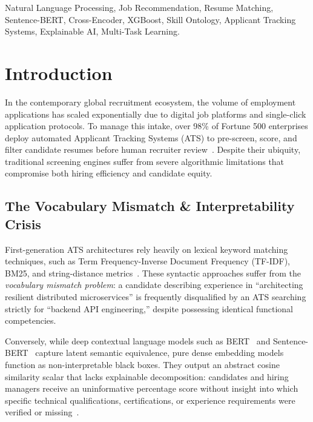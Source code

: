 \documentclass[conference]{IEEEtran}
\begin{document}
\begin{IEEEkeywords}
Natural Language Processing, Job Recommendation, Resume Matching, Sentence-BERT, Cross-Encoder, XGBoost, Skill Ontology, Applicant Tracking Systems, Explainable AI, Multi-Task Learning.
\end{IEEEkeywords}

\section{Introduction}

In the contemporary global recruitment ecosystem, the volume of employment applications has scaled exponentially due to digital job platforms and single-click application protocols. To manage this intake, over 98\% of Fortune 500 enterprises deploy automated Applicant Tracking Systems (ATS) to pre-screen, score, and filter candidate resumes before human recruiter review~\cite{panchasara2023}. Despite their ubiquity, traditional screening engines suffer from severe algorithmic limitations that compromise both hiring efficiency and candidate equity.

\subsection{The Vocabulary Mismatch \& Interpretability Crisis}
First-generation ATS architectures rely heavily on lexical keyword matching techniques, such as Term Frequency-Inverse Document Frequency (TF-IDF), BM25, and string-distance metrics~\cite{mao2023}. These syntactic approaches suffer from the \textit{vocabulary mismatch problem}: a candidate describing experience in ``architecting resilient distributed microservices'' is frequently disqualified by an ATS searching strictly for ``backend API engineering,'' despite possessing identical functional competencies.

Conversely, while deep contextual language models such as BERT~\cite{vaswani2017attention} and Sentence-BERT~\cite{reimers2019} capture latent semantic equivalence, pure dense embedding models function as non-interpretable black boxes. They output an abstract cosine similarity scalar that lacks explainable decomposition: candidates and hiring managers receive an uninformative percentage score without insight into which specific technical qualifications, certifications, or experience requirements were verified or missing~\cite{zhu2021}.
\end{document}
